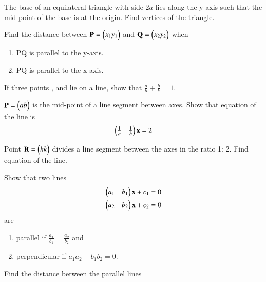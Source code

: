 %
%
%
\item The base of an equilateral triangle with side $2a$ lies along the y-axis such that the mid-point of the base is at the origin. Find vertices of the triangle.
%
\item Find the distance between $\mathbf{P}= \begin{pmatrix}x_1 y_1\end{pmatrix}$ and $\mathbf{Q} =\begin{pmatrix}x_2 y_2\end{pmatrix}$ when
\begin{enumerate}
\item PQ is parallel to the y-axis.
\item PQ is parallel to the x-axis.
\end{enumerate}
\item If three points ,  and  lie on a line, show that
$\frac{a}{h}+\frac{b}{k}= 1$.
\item $\mathbf{P}=\begin{pmatrix}a b\end{pmatrix}$ is the mid-point of a line segment between axes. Show that equation of the line is
\begin{align}
\begin{pmatrix}\frac{1}{a} & \frac{1}{b}\end{pmatrix}\mathbf{x} = 2
\end{align}
\item  Point $\mathbf{R}= \begin{pmatrix}h k\end{pmatrix}$ divides a line segment between the axes in the ratio 1: 2. Find equation of the line.
\item Show that two lines 
\begin{align}
\begin{pmatrix}a_1 & b_1\end{pmatrix}\mathbf{x} +c_1&= 0
\\
\begin{pmatrix}a_2 & b_2\end{pmatrix}\mathbf{x} +c_2&= 0
\end{align}
are 
\begin{enumerate}
\item parallel if $\frac{a_1}{b_1}=\frac{a_2}{b_2}$ and
\item perpendicular if $a_1a_2-b_1b_2 = 0$.
\end{enumerate}
%
\item Find the distance between the parallel lines
